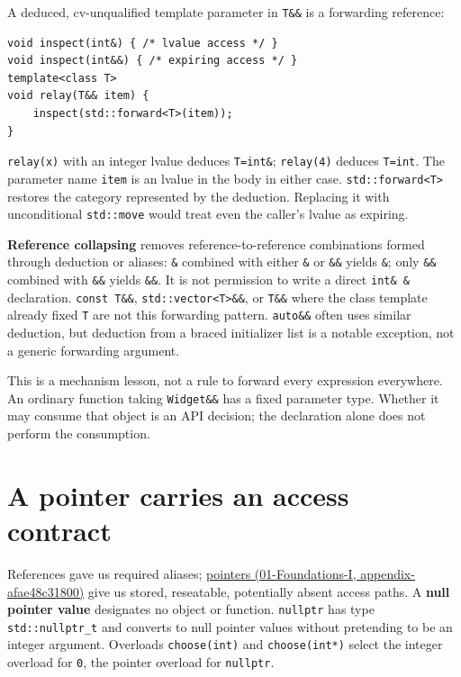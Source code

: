 A deduced, cv-unqualified template parameter in \texttt{T\&\&} is a forwarding reference:

\begin{verbatim}
void inspect(int&) { /* lvalue access */ }
void inspect(int&&) { /* expiring access */ }
template<class T>
void relay(T&& item) {
    inspect(std::forward<T>(item));
}
\end{verbatim}

\texttt{relay(x)} with an integer lvalue deduces \texttt{T=int\&}; \texttt{relay(4)} deduces \texttt{T=int}. The parameter name \texttt{item} is an lvalue in the body in either case. \texttt{std::forward\textless{}T\textgreater{}} restores the category represented by the deduction. Replacing it with unconditional \texttt{std::move} would treat even the caller's lvalue as expiring.

\textbf{Reference collapsing} removes reference-to-reference combinations formed through deduction or aliases: \texttt{\&} combined with either \texttt{\&} or \texttt{\&\&} yields \texttt{\&}; only \texttt{\&\&} combined with \texttt{\&\&} yields \texttt{\&\&}. It is not permission to write a direct \texttt{int\&\ \&} declaration. \texttt{const\ T\&\&}, \texttt{std::vector\textless{}T\textgreater{}\&\&}, or \texttt{T\&\&} where the class template already fixed \texttt{T} are not this forwarding pattern. \texttt{auto\&\&} often uses similar deduction, but deduction from a braced initializer list is a notable exception, not a generic forwarding argument.

This is a mechanism lesson, not a rule to forward every expression everywhere. An ordinary function taking \texttt{Widget\&\&} has a fixed parameter type. Whether it may consume that object is an API decision; the declaration alone does not perform the consumption.

\section{A pointer carries an access contract}\label{05-engine-i-ch003-a-pointer-carries-an-access-contract}

References gave us required aliases; \href{../01-Foundations-I/main.pdf\#nameddest=appendix-afae48c31800}{pointers (01-Foundations-I, appendix-afae48c31800)} give us stored, reseatable, potentially absent access paths. A \textbf{null pointer value} designates no object or function. \texttt{nullptr} has type \texttt{std::nullptr\_t} and converts to null pointer values without pretending to be an integer argument. Overloads \texttt{choose(int)} and \texttt{choose(int*)} select the integer overload for \texttt{0}, the pointer overload for \texttt{nullptr}.

